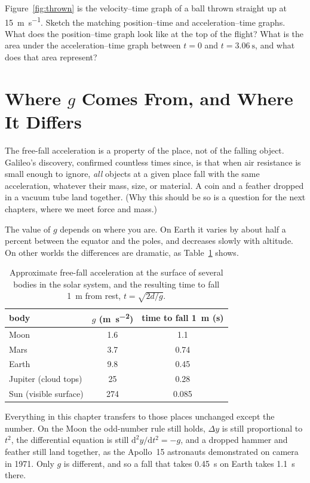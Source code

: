 \documentclass[11pt,twoside,openany]{book}
\newcommand{\dd}{\mathrm{d}}
\newcounter{check}[chapter]
\begin{document}
\begin{checkbox}
Figure~\ref{fig:thrown} is the velocity--time graph of a ball thrown straight up at \SI{15}{\metre\per\second}. Sketch the matching position--time and acceleration--time graphs. What does the position--time graph look like at the top of the flight? What is the area under the acceleration--time graph between $t = 0$ and $t = \SI{3.06}{\second}$, and what does that area represent?
\end{checkbox}

\section{Where \texorpdfstring{$g$}{g} Comes From, and Where It Differs}

The free-fall acceleration is a property of the place, not of the falling object. Galileo's discovery, confirmed countless times since, is that when air resistance is small enough to ignore, \emph{all} objects at a given place fall with the same acceleration, whatever their mass, size, or material. A coin and a feather dropped in a vacuum tube land together. (Why this should be so is a question for the next chapters, where we meet force and mass.)

The value of $g$ depends on where you are. On Earth it varies by about half a percent between the equator and the poles, and decreases slowly with altitude. On other worlds the differences are dramatic, as Table~\ref{tab:gvalues} shows.

\begin{table}[htb]
\centering
\caption{Approximate free-fall acceleration at the surface of several bodies in the solar system, and the resulting time to fall \SI{1}{\metre} from rest, $t = \sqrt{2d/g}$.}
\label{tab:gvalues}
\renewcommand{\arraystretch}{1.2}
\begin{tabular}{lcc}
\toprule
body & $g$ (\si{\metre\per\second\squared}) & time to fall \SI{1}{\metre} (s) \\
\midrule
Moon    & 1.6  & 1.1 \\
Mars    & 3.7  & 0.74 \\
Earth   & 9.8  & 0.45 \\
Jupiter (cloud tops) & 25 & 0.28 \\
Sun (visible surface) & 274 & 0.085 \\
\bottomrule
\end{tabular}
\end{table}

Everything in this chapter transfers to those places unchanged except the number. On the Moon the odd-number rule still holds, $\Delta y$ is still proportional to $t^2$, the differential equation is still $\dd^2 y/\dd t^2 = -g$, and a dropped hammer and feather still land together, as the Apollo~15 astronauts demonstrated on camera in 1971. Only $g$ is different, and so a fall that takes \SI{0.45}{\second} on Earth takes \SI{1.1}{\second} there.
\end{document}
